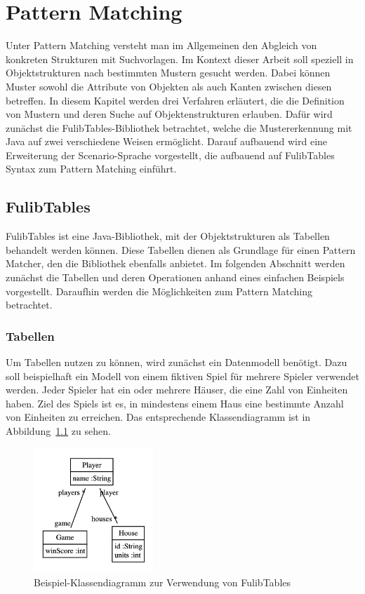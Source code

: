 \chapter{Pattern Matching}\label{ch:pattern-matching}

Unter Pattern Matching versteht man im Allgemeinen den Abgleich von konkreten Strukturen mit Suchvorlagen.
Im Kontext dieser Arbeit soll speziell in Objektstrukturen nach bestimmten Mustern gesucht werden.
Dabei können Muster sowohl die Attribute von Objekten als auch Kanten zwischen diesen betreffen.
In diesem Kapitel werden drei Verfahren erläutert, die die Definition von Mustern und deren Suche auf Objektenstrukturen erlauben.
Dafür wird zunächst die FulibTables\cite{fulibTables}-Bibliothek betrachtet, welche die Mustererkennung mit Java auf zwei verschiedene Weisen ermöglicht.
Darauf aufbauend wird eine Erweiterung der Scenario-Sprache vorgestellt, die aufbauend auf FulibTables Syntax zum Pattern Matching einführt.

\section{FulibTables}\label{sec:fulib-tables}

FulibTables\cite{fulibTables} ist eine Java-Bibliothek, mit der Objektstrukturen als Tabellen behandelt werden können.
Diese Tabellen dienen als Grundlage für einen Pattern Matcher, den die Bibliothek ebenfalls anbietet.
Im folgenden Abschnitt werden zunächst die Tabellen und deren Operationen anhand eines einfachen Beispiels vorgestellt.
Daraufhin werden die Möglichkeiten zum Pattern Matching betrachtet.

\subsection{Tabellen}\label{subsec:tables}

Um Tabellen nutzen zu können, wird zunächst ein Datenmodell benötigt.
Dazu soll beispielhaft ein Modell von einem fiktiven Spiel für mehrere Spieler verwendet werden.
Jeder Spieler hat ein oder mehrere Häuser, die eine Zahl von Einheiten haben.
Ziel des Spiels ist es, in mindestens einem Haus eine bestimmte Anzahl von Einheiten zu erreichen.
Das entsprechende Klassendiagramm ist in Abbildung~\ref{fig:game-class-diagram} zu sehen.

\begin{figure}
    \centering
    \includegraphics[width=0.4\textwidth]{chapter/pattern-matching/img/game-class-diagram.png}
    \caption{Beispiel-Klassendiagramm zur Verwendung von FulibTables}
    \label{fig:game-class-diagram}
\end{figure}

